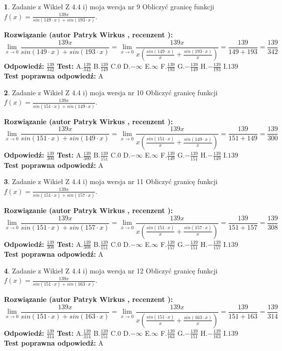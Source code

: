 \documentclass[12pt, a4paper]{article}
\theoremstyle{definition} %
\newtheorem{zad}{}
\newcommand{\zadStart}[1]{\begin{zad}#1\newline}
\newcommand{\zadStop}{\end{zad}}
\newcommand{\rozwStart}[2]{\noindent \textbf{Rozwiązanie (autor #1 , recenzent #2): }\newline}
\newcommand{\rozwStop}{\newline}
\newcommand{\odpStart}{\noindent \textbf{Odpowiedź:}\newline}
\newcommand{\odpStop}{\newline}
\newcommand{\testStart}{\noindent \textbf{Test:}\newline}
\newcommand{\testStop}{\newline}
\newcommand{\kluczStart}{\noindent \textbf{Test poprawna odpowiedź:}\newline}
\newcommand{\kluczStop}{\newline}
\begin{document}
\zadStart{Zadanie z Wikieł Z 4.4 i) moja wersja nr 9}
Obliczyć granicę funkcji $f(x)=\frac{139x}{sin(149\cdot x) +sin(193\cdot x)}$.
\zadStop
\rozwStart{Patryk Wirkus}{}
$$\lim\limits_{x\to 0}\frac{139x}{sin(149\cdot x) +sin(193\cdot x)}=\lim\limits_{x\to 0}\frac{139x}{x(\frac{sin(149\cdot x)}{x}+\frac{sin(193\cdot x)}{x})}=\frac{139}{149+193} = \frac{139}{342}$$
\rozwStop
\odpStart
$\frac{139}{342}$
\odpStop
\testStart
A.$\frac{139}{342}$
B.$\frac{139}{149}$
C.$0$
D.$-\infty$
E.$\infty$
F.$\frac{139}{193}$
G.$-\frac{139}{149}$
H.$-\frac{139}{193}$
I.$139$
\testStop
\kluczStart
A
\kluczStop



\zadStart{Zadanie z Wikieł Z 4.4 i) moja wersja nr 10}
Obliczyć granicę funkcji $f(x)=\frac{139x}{sin(151\cdot x) +sin(149\cdot x)}$.
\zadStop
\rozwStart{Patryk Wirkus}{}
$$\lim\limits_{x\to 0}\frac{139x}{sin(151\cdot x) +sin(149\cdot x)}=\lim\limits_{x\to 0}\frac{139x}{x(\frac{sin(151\cdot x)}{x}+\frac{sin(149\cdot x)}{x})}=\frac{139}{151+149} = \frac{139}{300}$$
\rozwStop
\odpStart
$\frac{139}{300}$
\odpStop
\testStart
A.$\frac{139}{300}$
B.$\frac{139}{151}$
C.$0$
D.$-\infty$
E.$\infty$
F.$\frac{139}{149}$
G.$-\frac{139}{151}$
H.$-\frac{139}{149}$
I.$139$
\testStop
\kluczStart
A
\kluczStop



\zadStart{Zadanie z Wikieł Z 4.4 i) moja wersja nr 11}
Obliczyć granicę funkcji $f(x)=\frac{139x}{sin(151\cdot x) +sin(157\cdot x)}$.
\zadStop
\rozwStart{Patryk Wirkus}{}
$$\lim\limits_{x\to 0}\frac{139x}{sin(151\cdot x) +sin(157\cdot x)}=\lim\limits_{x\to 0}\frac{139x}{x(\frac{sin(151\cdot x)}{x}+\frac{sin(157\cdot x)}{x})}=\frac{139}{151+157} = \frac{139}{308}$$
\rozwStop
\odpStart
$\frac{139}{308}$
\odpStop
\testStart
A.$\frac{139}{308}$
B.$\frac{139}{151}$
C.$0$
D.$-\infty$
E.$\infty$
F.$\frac{139}{157}$
G.$-\frac{139}{151}$
H.$-\frac{139}{157}$
I.$139$
\testStop
\kluczStart
A
\kluczStop



\zadStart{Zadanie z Wikieł Z 4.4 i) moja wersja nr 12}
Obliczyć granicę funkcji $f(x)=\frac{139x}{sin(151\cdot x) +sin(163\cdot x)}$.
\zadStop
\rozwStart{Patryk Wirkus}{}
$$\lim\limits_{x\to 0}\frac{139x}{sin(151\cdot x) +sin(163\cdot x)}=\lim\limits_{x\to 0}\frac{139x}{x(\frac{sin(151\cdot x)}{x}+\frac{sin(163\cdot x)}{x})}=\frac{139}{151+163} = \frac{139}{314}$$
\rozwStop
\odpStart
$\frac{139}{314}$
\odpStop
\testStart
A.$\frac{139}{314}$
B.$\frac{139}{151}$
C.$0$
D.$-\infty$
E.$\infty$
F.$\frac{139}{163}$
G.$-\frac{139}{151}$
H.$-\frac{139}{163}$
I.$139$
\testStop
\kluczStart
A
\kluczStop
\end{document}
